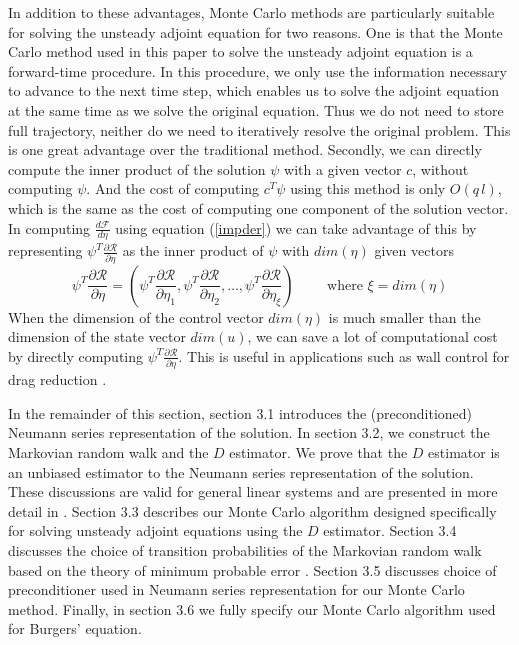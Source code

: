 \documentclass[a4paper,11pt]{article}
\theoremstyle{remark}
\theoremstyle{definition}
\begin{document}
    In addition to these advantages, Monte Carlo methods are
    particularly suitable for solving the unsteady adjoint equation for
    two reasons.  One is that the Monte Carlo method used in this paper
    to solve the unsteady adjoint equation is a forward-time procedure.
    In this procedure, we only use the information necessary to
    advance to the next time step, which enables us to solve the adjoint
    equation at the same time as we solve the original equation.  Thus we
    do not need to store full trajectory, neither do we need to
    iteratively resolve the original problem.  This is one great
    advantage over the traditional method.  Secondly, we can directly
    compute the inner product of the solution $\psi$ with a given vector
    $c$, without computing $\psi$.  And the cost of computing $c^T \psi$
    using this method is only $O(q\,l)$, which is the same as the cost of
    computing one component of the solution vector.  In computing
    $\frac{d\mathcal{F}}{d\eta}$ using equation (\ref{impder}) we can take
    advantage of this by representing $\psi^T \frac{\partial
    \mathcal{R}}{\partial \eta}$ as the inner product of $\psi$ with
    $dim(\eta)$ given vectors
    \[ \psi^T \frac{\partial \mathcal{R}}{\partial \eta}
        = \left( \psi^T \frac{\partial \mathcal{R}}{\partial \eta_1},
                 \psi^T \frac{\partial \mathcal{R}}{\partial \eta_2}, \ldots,
                 \psi^T \frac{\partial \mathcal{R}}{\partial \eta_\xi}
          \right) \qquad \mbox{ where } \xi = dim(\eta)
    \]
    When the dimension of the control vector $dim(\eta)$ is much smaller than
    the dimension of the state vector $dim(u)$, we can save a lot of
    computational cost by directly computing
    $\psi^T \frac{\partial \mathcal{R}}{\partial \eta}$.
    This is useful in applications such as wall control for drag reduction
    \cite{Choi1993,Bewley2001}.
    
    In the remainder of this section, section 3.1 introduces the
    (preconditioned) Neumann series representation of the solution.
    In section 3.2, we construct the Markovian random walk and the $D$
    estimator.  We prove that the $D$ estimator is an unbiased estimator
    to the Neumann series representation of the solution.  These discussions
    are valid for general linear systems and are presented in more detail in
    \cite{Okten2005}.  Section 3.3 describes our Monte Carlo algorithm
    designed specifically for solving unsteady adjoint equations using
    the $D$ estimator.  Section 3.4 discusses the choice of transition
    probabilities of the Markovian random walk based on the theory of
    minimum probable error \cite{Dimov1991}.  Section 3.5 discusses choice
    of preconditioner used in Neumann series representation for our
    Monte Carlo method.  Finally, in section 3.6 we fully specify our
    Monte Carlo algorithm used for Burgers' equation.
    
\end{document}
